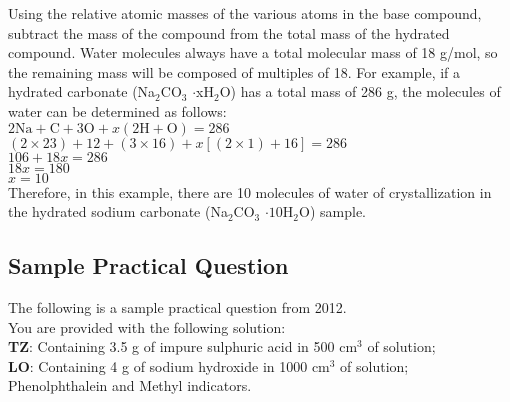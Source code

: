 \begin{enumerate}
Using the relative atomic masses of the various atoms in the base compound, subtract the mass of the compound from the total mass of the hydrated compound. Water molecules always have a total molecular mass of 18 g/mol, so the remaining mass will be composed of multiples of 18. For example, if a hydrated carbonate (Na$_2$CO$_3$ $\cdot$xH$_2$O) has a total mass of 286 g, the molecules of water can be determined as follows:\\
$2\text{Na} + \text{C} + 3\text{O} + x(2\text{H} + \text{O}) = 286$\\
$(2 \times 23) + 12 + (3 \times 16) + x[(2 \times 1) + 16] = 286$\\
$106 + 18x = 286$\\
$18x = 180$\\
$x = 10$\\
Therefore, in this example, there are 10 molecules of water of crystallization in the hydrated sodium carbonate (Na$_2$CO$_3$ $\cdot10$H$_2$O) sample.
\end{enumerate}



\subsection{Sample Practical Question}
The following is a sample practical question from 2012.\\


\noindent You are provided with the following solution:\\

\noindent \textbf{TZ}: Containing 3.5 g of impure sulphuric acid in 500 cm$^3$ of solution;\\
\textbf{LO}: Containing 4 g of sodium hydroxide in 1000 cm$^3$ of solution;\\
Phenolphthalein and Methyl indicators.\\

